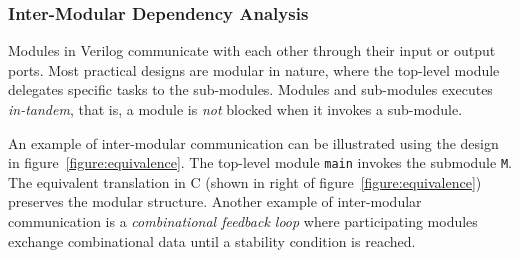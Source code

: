 \subsubsection{Inter-Modular Dependency Analysis}
%
Modules in Verilog communicate with each other through their input or output
ports. Most practical designs are modular in nature, where the top-level 
module delegates specific tasks to the sub-modules.
Modules and sub-modules executes \emph{in-tandem}, that is, a
module is \emph{not} blocked when it invokes a sub-module. 


An example of inter-modular communication can be illustrated
using the design in figure~\ref{figure:equivalence}.  The top-level 
module \texttt{main} invokes the submodule \texttt{M}.  
The equivalent translation in C (shown in right of figure~\ref{figure:equivalence}) 
preserves the modular structure. 
%
Another example of inter-modular communication is a \emph{combinational feedback loop} 
where participating modules exchange combinational data until a stability condition is reached.  
%
